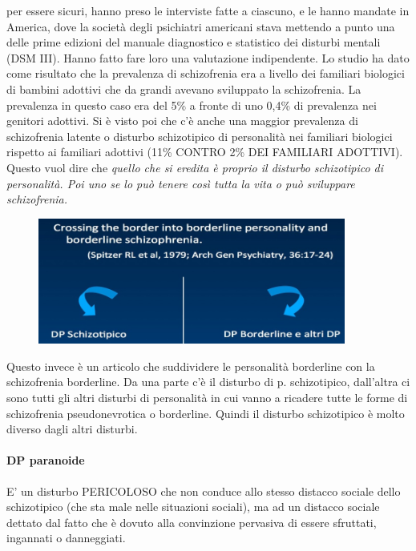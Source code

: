 per essere sicuri, hanno preso le interviste fatte a ciascuno, e le
hanno mandate in America, dove la società degli psichiatri americani
stava mettendo a punto una delle prime edizioni del manuale diagnostico
e statistico dei disturbi mentali (DSM III). Hanno fatto fare loro una
valutazione indipendente. Lo studio ha dato come risultato che la
prevalenza di schizofrenia era a livello dei familiari biologici di
bambini adottivi che da grandi avevano sviluppato la schizofrenia. La
prevalenza in questo caso era del 5\% a fronte di uno 0,4\% di
prevalenza nei genitori adottivi. Si è visto poi che c'è anche una
maggior prevalenza di schizofrenia latente o disturbo schizotipico di
personalità nei familiari biologici rispetto ai familiari adottivi (11\%
CONTRO 2\% DEI FAMILIARI ADOTTIVI). Questo vuol dire che \emph{quello
che si eredita è proprio il disturbo schizotipico di personalità. Poi
uno se lo può tenere così tutta la vita o può sviluppare schizofrenia.}

\begin{figure}[!ht]
\centering
	\includegraphics[width=0.9\textwidth]{011/image7.jpeg}
\end{figure}

Questo
invece è un articolo che suddividere le personalità borderline con la
schizofrenia borderline. Da una parte c'è il disturbo di p.
schizotipico, dall'altra ci sono tutti gli altri disturbi di personalità
in cui vanno a ricadere tutte le forme di schizofrenia pseudonevrotica o
borderline. Quindi il disturbo schizotipico è molto diverso dagli altri
disturbi.

\paragraph{DP paranoide}

E' un disturbo PERICOLOSO che non conduce allo stesso distacco sociale
dello schizotipico (che sta male nelle situazioni sociali), ma ad un
distacco sociale dettato dal fatto che è dovuto alla convinzione
pervasiva di essere sfruttati, ingannati o danneggiati.

